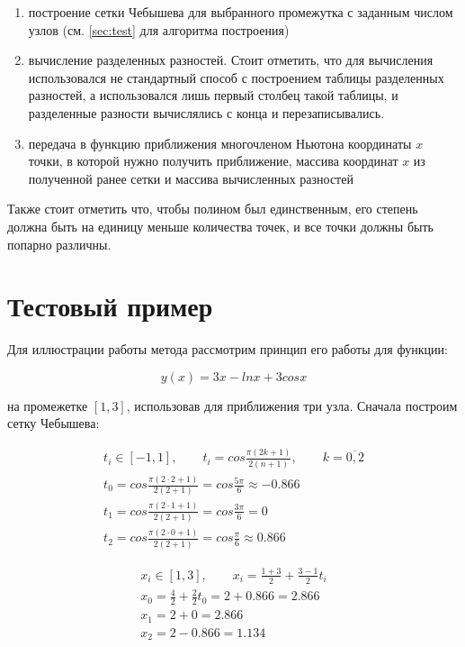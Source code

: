 \documentclass[11pt]{article}
\begin{document}
\begin{enumerate}
    \item построение сетки Чебышева для выбранного промежутка с заданным числом узлов (см. \autoref{sec:test} для алгоритма построения)
    \item вычисление разделенных разностей. Стоит отметить, что для вычисления использовался не стандартный способ с построением таблицы разделенных разностей, а использовался лишь первый столбец такой таблицы, и разделенные разности вычислялись с конца и перезаписывались.
    \item передача в функцию приближения многочленом Ньютона координаты $x$ точки, в которой нужно получить приближение, массива координат $x$ из полученной ранее сетки и массива вычисленных разностей
\end{enumerate}

\bigskip

Также стоит отметить что, чтобы полином был единственным, его степень должна быть на
единицу меньше количества точек, и все точки должны быть попарно различны.

\section{Тестовый пример}\label{sec:test}

Для иллюстрации работы метода рассмотрим принцип его работы для функции:

\begin{equation}
y(x) = 3x - ln x + 3 cos x
\end{equation}

на промежетке $[1, 3]$, использовав для приближения три узла.
Сначала построим сетку Чебышева:

\begin{gather}
t_i \in [-1, 1], \qquad t_i = cos \frac{\pi (2k + 1)}{2(n+1)}, \qquad k = \overline{0, 2} \nonumber \\
t_0 = cos \frac{\pi (2 \cdot 2 + 1)}{2(2 + 1)} = cos \frac{5\pi}{6} \approx -0.866 \nonumber \\
t_1 = cos \frac{\pi (2 \cdot 1 + 1)}{2(2 + 1)} = cos \frac{3\pi}{6} = 0 \nonumber \\
t_2 = cos \frac{\pi (2 \cdot 0 + 1)}{2(2 + 1)} = cos \frac{\pi}{6} \approx 0.866 \nonumber
\end{gather}

\begin{gather}
x_i \in [1, 3], \qquad x_i = \frac{1 + 3}{2} + \frac{3 - 1}{2} t_i \nonumber \\
x_0 = \frac{4}{2} + \frac{2}{2} t_0 = 2 + 0.866 = 2.866 \nonumber \\
x_1 = 2 + 0 = 2.866 \nonumber \\
x_2 = 2 - 0.866 = 1.134 \nonumber
\end{gather}
\end{document}
